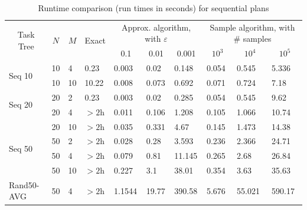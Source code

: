 \documentclass[review]{elsarticle}
\begin{document}
\begin{table}[htb!]
	{\footnotesize
		\begin{tabular}{|l|l|l|l||l|l|l||p{0.9cm}|p{0.9cm}|p{0.9cm}|}
			\hline
			\multicolumn{1}{|c|}{\multirow{2}{*}{Task Tree}} & \multicolumn{1}{c|}{\multirow{2}{*}{$N$}} & \multicolumn{1}{c|}{\multirow{2}{*}{$M$}} & \multirow{2}{*}{Exact} & \multicolumn{3}{c|}{Approx. algorithm, with $\varepsilon$} & \multicolumn{3}{c|}{Sample algorithm, with \# samples} \\ \cline{5-10} 
			\multicolumn{1}{|c|}{} & \multicolumn{1}{c|}{} & \multicolumn{1}{c|}{} &  & \multicolumn{1}{c|}{0.1} & \multicolumn{1}{c|}{0.01} & \multicolumn{1}{c|}{0.001} & \multicolumn{1}{c|}{$10^{3}$} & \multicolumn{1}{c|}{$10^{4}$} & \multicolumn{1}{c|}{$10^{5}$}  \\ \hline \hline
			\multirow{2}{*}{Seq 10} & 10 & 4 & 0.23 & 0.003 & 0.02 & 0.148  & 0.054 & 0.545 &5.336  \\ \cline{2-10} 
			& 10 & 10 & 10.22 & 0.008 & 0.073 & 0.692 & 0.071 & 0.724 & 7.18  \\ \hline
			\multirow{2}{*}{Seq 20} & 20 & 2 & 0.23 & 0.003 & 0.02 & 0.285  & 0.054 & 0.545 & 9.62  \\ \cline{2-10} 
			& 20 & 4 & $> 2$h & 0.011 & 0.106 & 1.208 & 0.105 & 1.066 & 10.74 \\ \cline{2-10} 
			& 20 & 10 & $> 2$h & 0.035 & 0.331 & 4.67 & 0.145 & 1.473 & 14.38  \\ \hline
			\multirow{2}{*}{Seq 50} & 50 & 2 & $> 2$h & 0.028 &  0.28 & 3.593  & 0.236 & 2.366 & 24.71  \\ \cline{2-10} 
			& 50 & 4 & $> 2$h & 0.079 & 0.81 & 11.145 & 0.265 & 2.68 & 26.84\\ \cline{2-10}  
			& 50 & 10 & $> 2$h & 0.227 & 3.1 & 38.01 & 0.354 & 3.63 & 35.63  \\ \hline
			\multirow{1}{*}{Rand50-AVG} & 50 & 4 & $>2$h & 1.1544 & 19.77 & 390.58 & 5.676 & 55.021 & 590.17 \\   \hline
		\end{tabular}
		\caption{Runtime comparison (run times in seconds) for sequential plans}
		\label{tab:runtimes2}
	}
\end{table}

\end{document}
